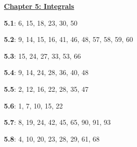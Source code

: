 \documentclass{siproblemset}
\begin{document}
    \begin{multicols*}{2}
%        
%        
%        
%        
%        
%        
%        
%        
%        
%        
%        
%        
%        
%        
%        
%        
%        
%        
%        
%        
%        
%        
%        
%        
%        
%        
%        
%        
%        
        
        \underline{\textbf{Chapter 5: Integrals}}
        
        \textbf{5.1}: 6, 15, 18, 23, 30, 50
        
        \textbf{5.2}: 9, 14, 15, 16, 41, 46, 48, 57, 58, 59, 60
        
        \textbf{5.3}: 15, 24, 27, 33, 53, 66
        
        \textbf{5.4}: 9, 14, 24, 28, 36, 40, 48
        
        \textbf{5.5}: 2, 12, 16, 22, 28, 35, 47
        
        \textbf{5.6}: 1, 7, 10, 15, 22
        
        \textbf{5.7}: 8, 19, 24, 42, 45, 65, 90, 91, 93
        
        \textbf{5.8}: 4, 10, 20, 23, 28, 29, 61, 68
    \end{multicols*}
    
\end{document}

